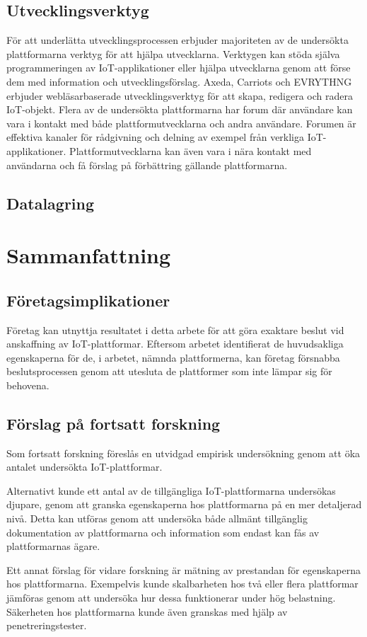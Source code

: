 \subsection{Utvecklingsverktyg}
För att underlätta utvecklingsprocessen erbjuder majoriteten av de undersökta 
plattformarna verktyg för att hjälpa utvecklarna. Verktygen kan stöda själva
programmeringen av IoT-applikationer eller hjälpa utvecklarna genom
att förse dem med information och utvecklingsförslag.
Axeda, Carriots och EVRYTHNG erbjuder webläsarbaserade utvecklingsverktyg för 
att skapa, redigera och radera IoT-objekt. Flera av de undersökta plattformarna 
har forum där användare kan vara i kontakt med både plattformutvecklarna
och andra användare. Forumen är effektiva kanaler för rådgivning och delning
av exempel från verkliga IoT-applikationer. Plattformutvecklarna kan även vara
i nära kontakt med användarna och få förslag på förbättring gällande
plattformarna. 




\subsection{Datalagring}

\pagebreak
\section{Sammanfattning}

\subsection{Företagsimplikationer}
Företag kan utnyttja resultatet i detta arbete för att göra exaktare beslut
vid anskaffning av IoT-plattformar. Eftersom arbetet identifierat de
huvudsakliga egenskaperna för de, i arbetet, nämnda plattformerna, kan företag 
försnabba beslutsprocessen genom att utesluta de plattformer som inte lämpar sig
för behovena.

\subsection{Förslag på fortsatt forskning}
Som fortsatt forskning föreslås en utvidgad empirisk undersökning genom att
öka antalet undersökta IoT-plattformar. 

Alternativt kunde ett antal av de tillgängliga IoT-plattformarna undersökas 
djupare, genom att granska egenskaperna hos plattformarna på en mer detaljerad
nivå. Detta kan utföras genom att undersöka både allmänt tillgänglig 
dokumentation av plattformarna och information som endast kan fås av 
plattformarnas ägare.

Ett annat förslag för vidare forskning är mätning av prestandan för egenskaperna 
hos plattformarna. Exempelvis kunde skalbarheten hos två eller flera plattformar
jämföras genom att undersöka hur dessa funktionerar under hög belastning.
Säkerheten hos plattformarna kunde även granskas med hjälp av
penetreringstester.

